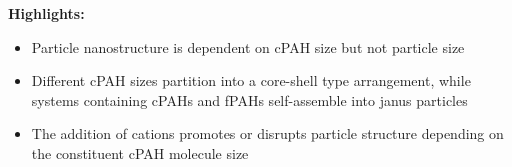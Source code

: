 \documentclass[como,a4paper,12pt,final]{Classes/c4e-preprint}
\begin{document}
\textbf{Highlights:}

\begin{itemize}
\item Particle nanostructure is dependent on cPAH size but not particle size
\item Different cPAH sizes partition into a core-shell type arrangement, while systems containing cPAHs and fPAHs self-assemble into janus particles
\item The addition of cations promotes or disrupts particle structure depending on the constituent cPAH molecule size
\end{itemize}

\vfill

\clearpage \setcounter{tocdepth}{3} \tableofcontents

\clearpage


\clearpage \appendix
{}


\clearpage \citeindexfalse

\end{document}
